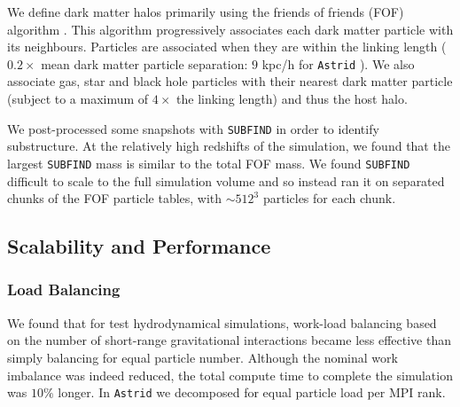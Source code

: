 \documentclass[fleqn,usenatbib]{mnras}
\def\astrid{\texttt{Astrid} }
\begin{document}
We define dark matter halos primarily using the friends of friends (FOF) algorithm \citep{Davis1985}. This algorithm progressively associates each dark matter particle with its neighbours. Particles are associated when they are within the linking length ($0.2 \times$ mean dark matter particle separation: $9$ kpc/h for \astrid). We also associate gas, star and black hole particles with their nearest dark matter particle (subject to a maximum of $4\times$ the linking length) and thus the host halo.

We post-processed some snapshots with \texttt{SUBFIND} \citep{2001MNRAS.328..726S} in order to identify substructure. At the relatively high redshifts of the simulation, we found that the largest \texttt{SUBFIND} mass is similar to the total FOF mass. We found \texttt{SUBFIND} difficult to scale to the full simulation volume and so instead ran it on separated chunks of the FOF particle tables, with $\sim 512^3$ particles for each chunk.


\subsection{Scalability and Performance}

\subsubsection{Load Balancing}
\label{sec:loadbalance}

We found that for test hydrodynamical simulations, work-load balancing based on the number of short-range gravitational interactions became less effective than simply balancing for equal particle number. Although the nominal work imbalance was indeed reduced, the total compute time to complete the simulation was $10\%$ longer. In \astrid we decomposed for equal particle load per MPI rank.
\end{document}
